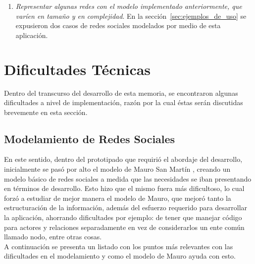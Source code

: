 \begin{enumerate}
  \item \emph{Representar algunas redes con el modelo implementado anteriormente, que varíen en tamaño y en complejidad}. En la sección~\ref{sec:ejemplos_de_uso} se expusieron dos casos de redes sociales modelados por medio de esta aplicación.
  
\end{enumerate}



\section{Dificultades Técnicas} %
\label{sec:dificultades_tecnicas}


Dentro del transcurso del desarrollo de esta memoria, se encontraron algunas dificultades a nivel de implementación, razón por la cual éstas serán discutidas brevemente en esta sección.

\subsection{Modelamiento de Redes Sociales} %
\label{sub:modelamiento_de_redes_sociales}

En este sentido, dentro del prototipado que requirió el abordaje del desarrollo, inicialmente se pasó por alto el modelo de Mauro San Martín \cite{tesismauro}, creando un modelo básico de redes sociales a medida que las necesidades se iban presentando en términos de desarrollo. Esto hizo que el mismo fuera más dificultoso, lo cual forzó a estudiar de mejor manera el modelo de Mauro, que mejoró tanto la estructuración de la información, además del esfuerzo requerido para desarrollar la aplicación, ahorrando dificultades por ejemplo: de tener que manejar código para actores y relaciones separadamente en vez de considerarlos un ente común llamado nodo, entre otras cosas.\\

A continuación se presenta un listado con los puntos más relevantes con las dificultades en el modelamiento y como el modelo de Mauro ayuda con esto.

